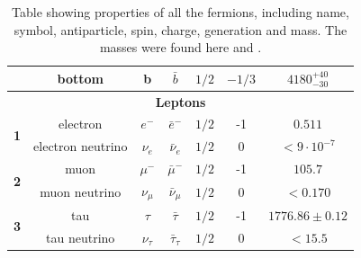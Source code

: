 \begin{table}[h!]
\begin{tabular}{|ccccccc|}
    \multicolumn{1}{|c|}{}                            & \multicolumn{1}{c|}{bottom}            & \multicolumn{1}{c|}{b}               & \multicolumn{1}{c|}{$\bar{b}$}             & \multicolumn{1}{c|}{$1/2$} & \multicolumn{1}{c|}{$-1/3$}  & $4180_{-30}^{+40}$                             \\ \hline
    \multicolumn{7}{|c|}{\textbf{Leptons}}                                                                                                                                                                                                                                                                               \\ \hline
    \multicolumn{1}{|c|}{\multirow{2}{*}{\textbf{1}}}                & \multicolumn{1}{c|}{electron}          & \multicolumn{1}{c|}{$e^-$}           & \multicolumn{1}{c|}{$\bar{e}^-$}           & \multicolumn{1}{c|}{$1/2$} & \multicolumn{1}{c|}{-1}              & $0.511$                                        \\ \cline{2-7} 
    \multicolumn{1}{|c|}{}                   & \multicolumn{1}{c|}{electron neutrino} & \multicolumn{1}{c|}{$\nu_{e}$}       & \multicolumn{1}{c|}{$\bar{\nu}_e$}         & \multicolumn{1}{c|}{$1/2$} & \multicolumn{1}{c|}{0}               & $<9 \cdot 10^{-7}$                                   \\ \hline
    \multicolumn{1}{|c|}{\multirow{2}{*}{\textbf{2}}} & \multicolumn{1}{c|}{muon}              & \multicolumn{1}{c|}{$\mu^-$}         & \multicolumn{1}{c|}{$\bar{\mu}^-$}         & \multicolumn{1}{c|}{$1/2$} & \multicolumn{1}{c|}{-1}              & $105.7$                                        \\ \cline{2-7} 
    \multicolumn{1}{|c|}{}                            & \multicolumn{1}{c|}{muon neutrino}     & \multicolumn{1}{c|}{$\nu_{\mu}$}     & \multicolumn{1}{c|}{$\bar{\nu}_{\mu}$}     & \multicolumn{1}{c|}{$1/2$} & \multicolumn{1}{c|}{0}               & $<0.170$                                       \\ \hline
    \multicolumn{1}{|c|}{\multirow{2}{*}{\textbf{3}}} & \multicolumn{1}{c|}{tau}               & \multicolumn{1}{c|}{$\tau$}          & \multicolumn{1}{c|}{$\bar{\tau}$}          & \multicolumn{1}{c|}{$1/2$} & \multicolumn{1}{c|}{-1}              & $1776.86 \pm 0.12$                             \\ \cline{2-7} 
    \multicolumn{1}{|c|}{}                            & \multicolumn{1}{c|}{tau neutrino}      & \multicolumn{1}{c|}{$\nu_{\tau}$}    & \multicolumn{1}{c|}{$\bar{\tau}_{\tau}$}   & \multicolumn{1}{c|}{$1/2$} & \multicolumn{1}{c|}{0}               & $< 15.5$                                       \\ \hline
    \end{tabular}
    \caption{Table showing properties of all the fermions, including name, symbol, antiparticle, spin, charge, generation and mass. The masses were found here \cite{Patrignani:2241948} and \cite{Katrin_}.}
    \label{tab:fermion_table}
    \end{table}
